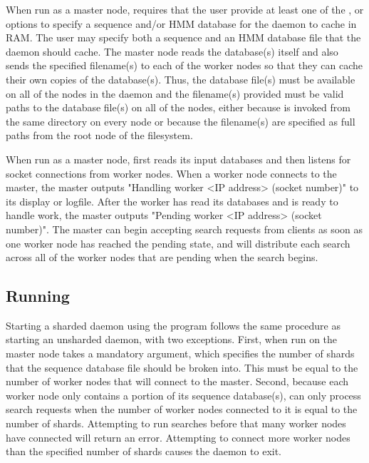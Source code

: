 \documentclass[notoc,justified]{tufte-book}    %
\begin{document}
When run as a master node,  requires that the user provide at least one of the , or  options to specify a sequence and/or HMM database for the daemon to cache in RAM.  The user may specify both a sequence and an HMM database file that the daemon should cache.  The master node reads the database(s) itself and also sends the specified filename(s) to each of the worker nodes so that they can cache their own copies of the database(s).  Thus, the database file(s) must be available on all of the nodes in the daemon and the filename(s) provided must be valid paths to the database file(s) on all of the nodes, either because  is invoked from the same directory on every node or because the filename(s) are specified as full paths from the root node of the filesystem.

When run as a master node,  first reads its input databases and then listens for socket connections from worker nodes.  When a worker node connects to the master, the master outputs  "Handling worker <IP address> (socket number)" to its display or logfile.  After the worker has read its databases and is ready to handle work, the master outputs "Pending worker <IP address> (socket number)".  The master can begin accepting search requests from clients as soon as one worker node has reached the pending state, and will distribute each search across all of the worker nodes that are pending when the search begins.


\subsection{Running }
Starting a sharded daemon using the  program follows the same procedure as starting an unsharded daemon, with two exceptions.  First, when run on the master node  takes a mandatory  argument, which specifies the number of shards that the sequence database file should be broken into.  This must be equal to the number of worker nodes that will connect to the master.  Second, because each worker node only contains a portion of its sequence database(s),  can only process search requests when the number of worker nodes connected to it is equal to the number of shards.  Attempting to run searches before that many worker nodes have connected will return an error.  Attempting to connect more worker nodes than the specified number of shards causes the daemon to exit.
\end{document}
